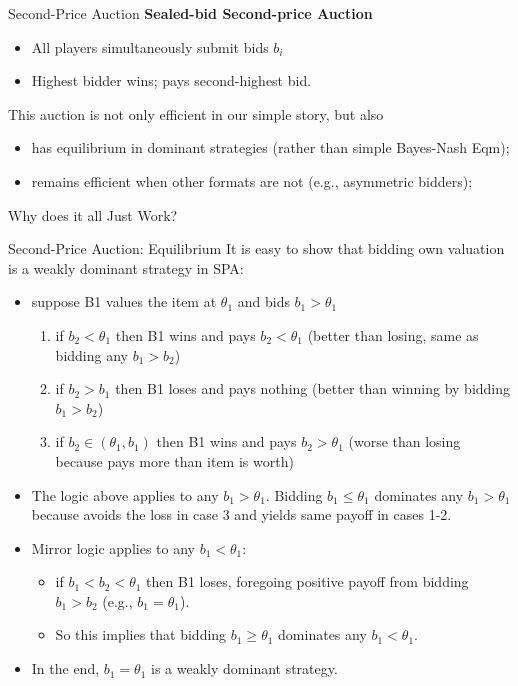 \documentclass[english,10pt
,aspectratio=169
]{beamer}
\begin{document}
\begin{frame}{Second-Price Auction}
	\textbf{Sealed-bid Second-price Auction}
	\begin{itemize}
		\item All players simultaneously submit bids $b_i$
		\item Highest bidder wins; pays second-highest bid.
	\end{itemize}
	\pause
	This auction is not only efficient in our simple story, but also
	\begin{itemize}
		\item has equilibrium in dominant strategies (rather than simple Bayes-Nash Eqm);
		\item remains efficient when other formats are not (e.g., asymmetric bidders);
	\end{itemize}
	Why does it all Just Work\texttrademark?
\end{frame}


\begin{frame}{Second-Price Auction: Equilibrium}
	It is easy to show that bidding own valuation is a weakly dominant strategy in SPA:
	\begin{itemize}
		\item suppose B1 values the item at $\theta_1$ and bids $b_1 > \theta_1$
		\begin{enumerate}
			\item if $b_2 < \theta_1$ then B1 wins and pays $b_2 < \theta_1$ (better than losing, same as bidding any $b_1 > b_2$)
			\item if $b_2 > b_1$ then B1 loses and pays nothing (better than winning by bidding $b_1 > b_2$)
			\item if $b_2 \in (\theta_1,b_1)$ then B1 wins and pays $b_2 > \theta_1$ (worse than losing because pays more than item is worth)
		\end{enumerate}
		\item The logic above applies to any $b_1 > \theta_1$. Bidding $b_1 \leq \theta_1$ dominates any $b_1 > \theta_1$ because avoids the loss in case 3 and yields same payoff in cases 1-2.
		\item Mirror logic applies to any $b_1 < \theta_1$:
		\begin{itemize}
			\item if $b_1 < b_2 < \theta_1$ then B1 loses, foregoing positive payoff from bidding $b_1 > b_2$ (e.g., $b_1 = \theta_1$).
			\item So this implies that bidding $b_1 \geq \theta_1$ dominates any $b_1 < \theta_1$.
		\end{itemize} 
		\item In the end, $b_1 = \theta_1$ is a weakly dominant strategy.
	\end{itemize}
\end{frame}
\end{document}
